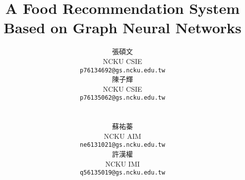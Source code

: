 \documentclass[10pt,twocolumn,letterpaper]{article}
\title{A Food Recommendation System Based on Graph Neural Networks}
\author{
\begin{minipage}{0.45\textwidth}
\centering
張碩文\\
NCKU CSIE\\
{\tt\small p76134692@gs.ncku.edu.tw}
\end{minipage}
\hfill
\begin{minipage}{0.45\textwidth}
\centering
陳子輝\\
NCKU CSIE\\
{\tt\small p76135062@gs.ncku.edu.tw}
\end{minipage}
\\[1.5cm] %
\begin{minipage}{0.45\textwidth}
\centering
蘇祐蓁\\
NCKU AIM\\
{\tt\small ne6131021@gs.ncku.edu.tw}
\end{minipage}
\hfill
\begin{minipage}{0.45\textwidth}
\centering
許漢權\\
NCKU IMI\\
{\tt\small q56135019@gs.ncku.edu.tw}
\end{minipage}
}
\begin{document}
\begin{CJK}{UTF8}{bkai}  %

\maketitle

    




{
    \small
    
    
}

\end{CJK}  %
\end{document}
